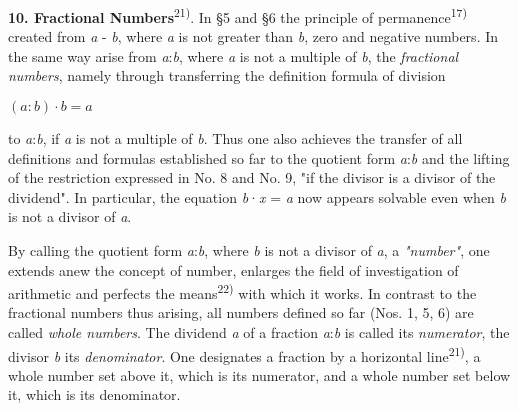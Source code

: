 \thispagestyle{fancy}

\vspace{0.5cm}

\textbf{10. Fractional Numbers}\textsuperscript{21)}. In §5 and §6 the principle of permanence\textsuperscript{17)} created from \textit{a} - \textit{b}, where \textit{a} is not greater than \textit{b}, zero and negative numbers. In the same way arise from \textit{a}:\textit{b}, where \textit{a} is not a multiple of \textit{b}, the \textit{fractional numbers}, namely through transferring the definition formula of division

\begin{center}
$(\textit{a}:\textit{b}) \cdot \textit{b} = \textit{a}$
\end{center}

to \textit{a}:\textit{b}, if \textit{a} is not a multiple of \textit{b}. Thus one also achieves the transfer of all definitions and formulas established so far to the quotient form \textit{a}:\textit{b} and the lifting of the restriction expressed in No. 8 and No. 9, "if the divisor is a divisor of the dividend". In particular, the equation \textit{b}·\textit{x} = \textit{a} now appears solvable even when \textit{b} is not a divisor of \textit{a}.

By calling the quotient form \textit{a}:\textit{b}, where \textit{b} is not a divisor of \textit{a}, a \textit{"number"}, one extends anew the concept of number, enlarges the field of investigation of arithmetic and perfects the means\textsuperscript{22)} with which it works. In contrast to the fractional numbers thus arising, all numbers defined so far (Nos. 1, 5, 6) are called \textit{whole numbers}. The dividend \textit{a} of a fraction \textit{a}:\textit{b} is called its \textit{numerator}, the divisor \textit{b} its \textit{denominator}. One designates a fraction by a horizontal line\textsuperscript{21)}, a whole number set above it, which is its numerator, and a whole number set below it, which is its denominator.

